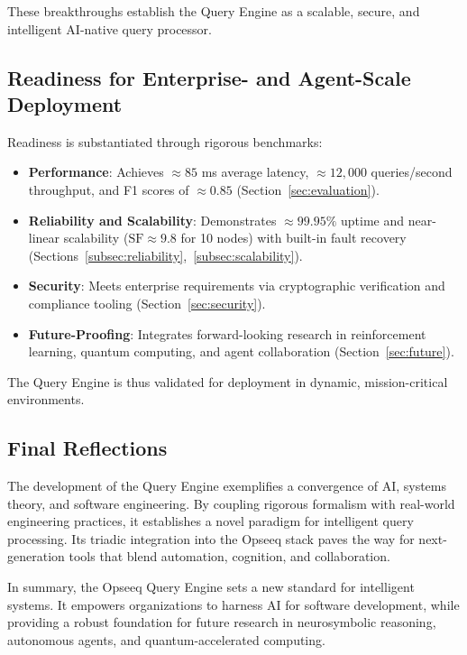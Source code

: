 \documentclass[11pt]{article}
\begin{document}
These breakthroughs establish the Query Engine as a scalable, secure, and intelligent AI-native query processor.

\subsection{Readiness for Enterprise- and Agent-Scale Deployment}

Readiness is substantiated through rigorous benchmarks:

\begin{itemize}
    \item \textbf{Performance}: Achieves $\approx 85$ ms average latency, $\approx 12{,}000$ queries/second throughput, and F1 scores of $\approx 0.85$ (Section~\ref{sec:evaluation}).
    \item \textbf{Reliability and Scalability}: Demonstrates $\approx 99.95\%$ uptime and near-linear scalability ($\text{SF} \approx 9.8$ for 10 nodes) with built-in fault recovery (Sections~\ref{subsec:reliability},~\ref{subsec:scalability}).
    \item \textbf{Security}: Meets enterprise requirements via cryptographic verification and compliance tooling (Section~\ref{sec:security}).
    \item \textbf{Future-Proofing}: Integrates forward-looking research in reinforcement learning, quantum computing, and agent collaboration (Section~\ref{sec:future}).
\end{itemize}

The Query Engine is thus validated for deployment in dynamic, mission-critical environments.

\subsection{Final Reflections}

The development of the Query Engine exemplifies a convergence of AI, systems theory, and software engineering. By coupling rigorous formalism with real-world engineering practices, it establishes a novel paradigm for intelligent query processing. Its triadic integration into the Opseeq stack paves the way for next-generation tools that blend automation, cognition, and collaboration.

In summary, the Opseeq Query Engine sets a new standard for intelligent systems. It empowers organizations to harness AI for software development, while providing a robust foundation for future research in neurosymbolic reasoning, autonomous agents, and quantum-accelerated computing.
\end{document}
